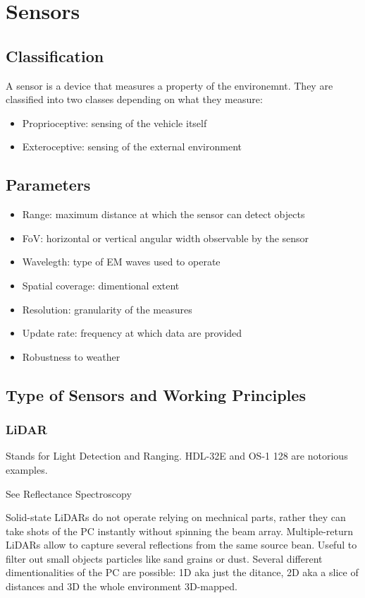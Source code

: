 \chapter{Sensors}

\section{Classification}
A sensor is a device that measures a property of the environemnt.
They are classified into two classes depending on what they measure:
\begin{itemize}
  \item Proprioceptive: sensing of the vehicle itself
  \item Exteroceptive: sensing of the external environment
\end{itemize}

\section{Parameters}
\begin{itemize}
  \item Range: maximum distance at which the sensor can detect objects
  \item FoV: horizontal or vertical angular width observable by the sensor
  \item Wavelegth: type of EM waves used to operate
  \item Spatial coverage: dimentional extent
  \item Resolution: granularity of the measures
  \item Update rate: frequency at which data are provided
  \item Robustness to weather
\end{itemize}

\section{Type of Sensors and Working Principles}
\subsection{LiDAR}
Stands for Light Detection and Ranging.
HDL-32E and OS-1 128 are notorious examples.

See Reflectance Spectroscopy

Solid-state LiDARs do not operate relying on mechnical parts, rather they can take shots of the PC instantly without spinning the beam array.
Multiple-return LiDARs allow to capture several reflections from the same source bean. Useful to filter out small objects particles like sand grains or dust.
Several different dimentionalities of the PC are possible: 1D aka just the ditance, 2D aka a slice of distances and 3D the whole environment 3D-mapped.

